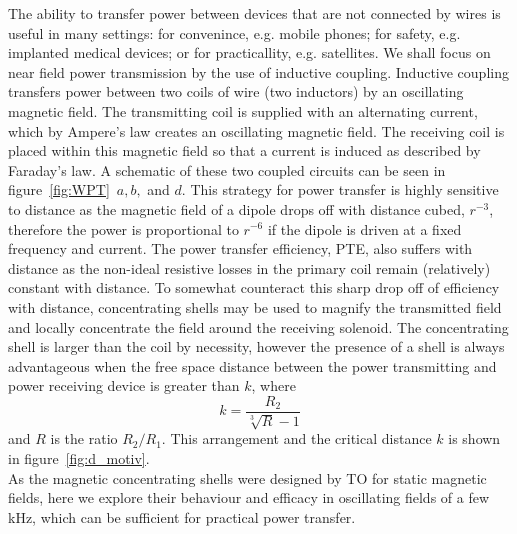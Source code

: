 \documentclass[11pt]{iopart}
\begin{document}
The ability to transfer power between devices that are not connected
by wires is useful in many settings: for convenince, e.g. mobile
phones; for safety, e.g. implanted medical devices; or for
practicallity, e.g. satellites. We shall focus on near field power
transmission by the use of inductive coupling. Inductive coupling
transfers power between two coils of wire (two inductors) by an
oscillating magnetic field.  The transmitting coil is supplied with an
alternating current, which by Ampere's law creates an oscillating
magnetic field. The receiving coil is placed within this magnetic
field so that a current is induced as described by Faraday's law. A
schematic of these two coupled circuits can be seen in
figure~\ref{fig:WPT}~$a, b,$ and $d$. This strategy for power transfer
is highly sensitive to distance as the magnetic field of a dipole
drops off with distance cubed, $r^{-3}$, therefore the power is
proportional to $r^{-6}$ if the dipole is driven at a fixed frequency
and current.  The power transfer efficiency, PTE, also suffers with
distance as the non-ideal resistive losses in the primary coil remain
(relatively) constant with distance. To somewhat counteract this sharp
drop off of efficiency with distance, concentrating shells may be used
to magnify the transmitted field and locally concentrate the field
around the receiving solenoid. The concentrating shell is larger than
the coil by necessity, however the presence of a shell is always
advantageous when the free space distance between the power
transmitting and power receiving device is greater than $k$, where
\begin{equation}
k = \frac{R_2}{\sqrt[3]{R}-1}
\end{equation}
and $R$ is the ratio $R_2/R_1$. This arrangement and the critical
distance $k$ is shown in figure~\ref{fig:d_motiv}.\\
As the magnetic concentrating shells were designed by TO for static
magnetic fields, here we explore their behaviour and efficacy in
oscillating fields of a few kHz, which can be sufficient for practical
power transfer\cite{}.\\



\end{document}
